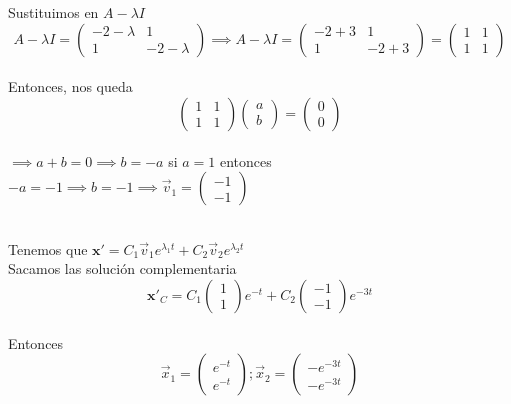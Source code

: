 \begin{itemize}
            \\
            \\
             Sustituimos en $A - \lambda I$
            $$A - \lambda I = \begin{pmatrix}
            -2- \lambda & 1\\
            1 & -2- \lambda
            \end{pmatrix} \implies A - \lambda I = \begin{pmatrix}
            -2 + 3 & 1\\
            1 & -2 + 3
            \end{pmatrix} = \begin{pmatrix}
            1 & 1\\
            1 & 1
            \end{pmatrix}$$
            \\
            Entonces, nos queda
            $$\begin{pmatrix}
            1 & 1\\
            1 & 1
            \end{pmatrix}\begin{pmatrix}
            a\\
            b
            \end{pmatrix} = \begin{pmatrix}
            0\\
            0
            \end{pmatrix}$$
            \\
            $\implies a + b = 0 \implies b = -a$ si $a = 1$ entonces $-a = -1 \implies b = -1 \implies \Vec{v}_1 = \begin{pmatrix}
            - 1\\
            - 1
            \end{pmatrix}$
\end{itemize}
\\
Tenemos que $\textbf{x}' = C_1\Vec{v}_1 e^{\lambda_1 t} + C_2\Vec{v}_2 e^{\lambda_2 t}$
 \\
 Sacamos las solución complementaria
 $$\textbf{x}'_C = C_1\begin{pmatrix}
 1\\
 1
 \end{pmatrix} e^{-t} + C_2\begin{pmatrix}
 -1\\
 -1
 \end{pmatrix}e^{-3t}$$
 \\
 Entonces $$\Vec{x}_1 = \begin{pmatrix}
 e^{-t}\\
 e^{-t}
 \end{pmatrix} ; \Vec{x}_2 = \begin{pmatrix}
 -e^{-3t}\\
 -e^{-3t}
 \end{pmatrix}$$
